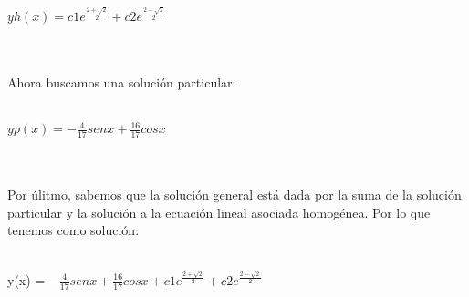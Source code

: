 \documentclass[a4paper,10pt]{article}
\begin{document}
\centerline{$yh(x)= c1e^{\frac{2+  \sqrt{2}}{2}}+c2e^{\frac{2-\sqrt{2}}{2}}$}\\\\
Ahora buscamos una solución particular:\\\\
\centerline{$yp(x)= -\frac{4}{17} senx + \frac{16}{17}cosx$ }\\\\
Por úlitmo, sabemos que la solución general está dada por la suma de la solución particular y la solución a la ecuación lineal asociada homogénea. Por lo que tenemos como solución:\\\\
\centerline{y(x) = $ -\frac{4}{17} senx + \frac{16}{17}cosx + c1e^{\frac{2+  \sqrt{2}}{2}}+c2e^{\frac{2-\sqrt{2}}{2}}$}\\\\\\
\end{document}
